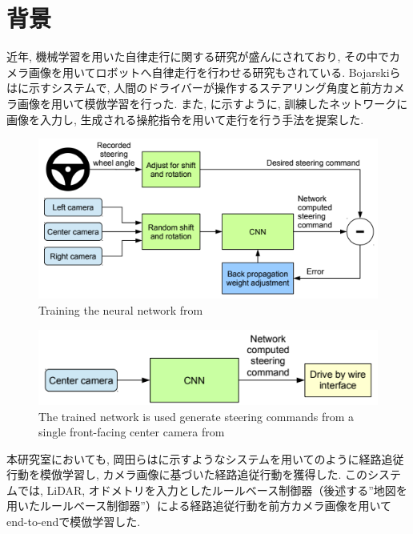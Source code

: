 
\section{背景}
近年, 機械学習を用いた自律走行に関する研究が盛んにされており, その中でカメラ画像を用いてロボットへ自律走行を行わせる研究もされている. Bojarskiら\cite{bojarski}はに示すシステムで, 人間のドライバーが操作するステアリング角度と前方カメラ画像を用いて模倣学習を行った. また, に示すように, 訓練したネットワークに画像を入力し, 生成される操舵指令を用いて走行を行う手法を提案した.

\vspace{0.5cm}

\begin{figure}[hbtp]
  \centering
 \includegraphics[keepaspectratio, scale=0.9]
      {images/bojarski_train.png}
 \caption{Training the neural network from \cite{bojarski}}
 \label{Fig:bojarski_train}
\end{figure}

\begin{figure}[hbtp]
     \centering
    \includegraphics[keepaspectratio, scale=0.7]
         {images/bojarski_test.png}
    \caption{The trained network is used generate steering commands from a single front-facing center camera from \cite{bojarski}}
    \label{Fig:bojarski_test}
\end{figure}

\newpage

本研究室においても, 岡田ら\cite{okada1}はに示すようなシステムを用いてのように経路追従行動を模倣学習し, カメラ画像に基づいた経路追従行動を獲得した. このシステムでは, LiDAR, オドメトリを入力としたルールベース制御器（後述する”地図を用いたルールベース制御器”）による経路追従行動を前方カメラ画像を用いてend-to-endで模倣学習した. 

